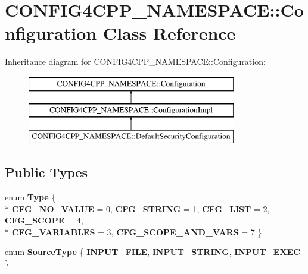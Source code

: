 \hypertarget{classCONFIG4CPP__NAMESPACE_1_1Configuration}{\section{C\-O\-N\-F\-I\-G4\-C\-P\-P\-\_\-\-N\-A\-M\-E\-S\-P\-A\-C\-E\-:\-:Configuration Class Reference}
\label{classCONFIG4CPP__NAMESPACE_1_1Configuration}
}
Inheritance diagram for C\-O\-N\-F\-I\-G4\-C\-P\-P\-\_\-\-N\-A\-M\-E\-S\-P\-A\-C\-E\-:\-:Configuration\-:\begin{figure}[H]
\begin{center}
\leavevmode
\includegraphics[height=3.000000cm]{classCONFIG4CPP__NAMESPACE_1_1Configuration}
\end{center}
\end{figure}
\subsection*{Public Types}
\begin{DoxyCompactItemize}
\item 
enum {\bfseries Type} \{ \\*
{\bfseries C\-F\-G\-\_\-\-N\-O\-\_\-\-V\-A\-L\-U\-E} = 0, 
{\bfseries C\-F\-G\-\_\-\-S\-T\-R\-I\-N\-G} = 1, 
{\bfseries C\-F\-G\-\_\-\-L\-I\-S\-T} = 2, 
{\bfseries C\-F\-G\-\_\-\-S\-C\-O\-P\-E} = 4, 
\\*
{\bfseries C\-F\-G\-\_\-\-V\-A\-R\-I\-A\-B\-L\-E\-S} = 3, 
{\bfseries C\-F\-G\-\_\-\-S\-C\-O\-P\-E\-\_\-\-A\-N\-D\-\_\-\-V\-A\-R\-S} = 7
 \}
\item 
enum {\bfseries Source\-Type} \{ {\bfseries I\-N\-P\-U\-T\-\_\-\-F\-I\-L\-E}, 
{\bfseries I\-N\-P\-U\-T\-\_\-\-S\-T\-R\-I\-N\-G}, 
{\bfseries I\-N\-P\-U\-T\-\_\-\-E\-X\-E\-C}
 \}
\end{DoxyCompactItemize}
